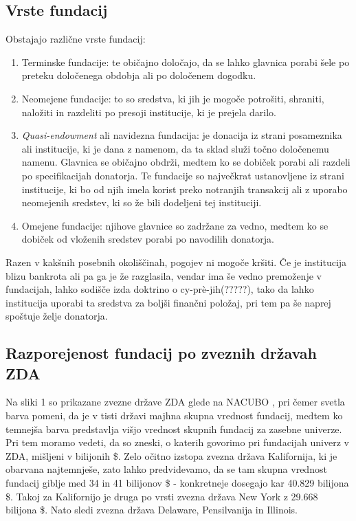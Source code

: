 \documentclass[12pt, a4paper]{article}
\begin{document}
\subsection{Vrste fundacij}
Obstajajo različne vrste fundacij:
\begin{enumerate}
\item Terminske fundacije: te običajno določajo, da se lahko glavnica porabi šele po preteku določenega obdobja ali po določenem dogodku.
\item Neomejene fundacije: to so sredstva, ki jih je mogoče potrošiti, shraniti, naložiti in razdeliti po presoji institucije, ki je prejela darilo.
\item \textit{Quasi-endowment} ali navidezna fundacija: je donacija iz strani posameznika ali institucije, ki je dana z namenom, da ta sklad služi točno določenemu namenu. Glavnica se običajno obdrži, medtem ko se dobiček porabi ali razdeli po specifikacijah donatorja. Te fundacije so največkrat ustanovljene iz strani institucije, ki bo od njih imela korist preko notranjih transakcij ali z uporabo neomejenih sredstev, ki so že bili dodeljeni tej instituciji.
\item Omejene fundacije: njihove glavnice so zadržane za vedno, medtem ko se dobiček od vloženih sredstev porabi po navodilih donatorja.
\end{enumerate}

Razen v kakšnih posebnih okoliščinah, pogojev ni mogoče kršiti. Če je institucija blizu bankrota ali pa ga je že razglasila, vendar ima še vedno premoženje v fundacijah, lahko sodišče izda doktrino o cy-prè-jih(?????), tako da lahko institucija uporabi ta sredstva za boljši finančni položaj, pri tem pa še naprej spoštuje želje donatorja.

\subsection{Razporejenost fundacij po zveznih državah ZDA}

Na sliki 1 so prikazane zvezne države ZDA glede na NACUBO \cite{wiki}, pri čemer svetla barva pomeni, da je v tisti državi majhna skupna vrednost fundacij, medtem ko temnejša barva predstavlja višjo vrednost skupnih fundacij za zasebne univerze. Pri tem moramo vedeti, da so zneski, o katerih govorimo pri fundacijah univerz v ZDA, mišljeni v bilijonih \$. Zelo očitno izstopa zvezna država Kalifornija, ki je obarvana najtemnješe, zato lahko predvidevamo, da se tam skupna vrednost fundacij giblje med 34 in 41 bilijonov \$ - konkretneje dosegajo kar 40.829
bilijona \$. Takoj za Kalifornijo je druga po vrsti zvezna država New York z 29.668 bilijona \$. Nato sledi zvezna država Delaware, Pensilvanija in Illinois. 
\end{document}
